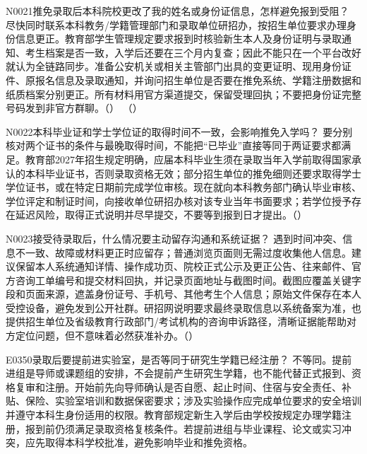 \begin{qa}{N0021}{推免录取后本科院校更改了我的姓名或身份证信息，怎样避免报到受阻？}
尽快同时联系本科教务/学籍管理部门和录取单位研招办，按招生单位要求办理身份信息更正。教育部学生管理规定要求报到时核验新生本人及身份证明与录取通知、考生档案是否一致，入学后还要在三个月内复查；因此不能只在一个平台改好就认为全链路同步。准备公安机关或相关主管部门出具的变更证明、现用身份证件、原报名信息及录取通知，并询问招生单位是否要在推免系统、学籍注册数据和纸质档案分别更正。所有材料用官方渠道提交，保留受理回执；不要把身份证完整号码发到非官方群聊。（） （）
\end{qa}
\begin{qa}{N0022}{本科毕业证和学士学位证的取得时间不一致，会影响推免入学吗？}
要分别核对两个证书的条件与最晚取得时间，不能把“已毕业”直接等同于两证要求都满足。教育部2027年招生规定明确，应届本科毕业生须在录取当年入学前取得国家承认的本科毕业证书，否则录取资格无效；部分招生单位的推免细则还要求取得学士学位证书，或在特定日期前完成学位审核。现在就向本科教务部门确认毕业审核、学位评定和制证时间，向接收单位研招办核对该专业当年书面要求；若学位授予存在延迟风险，取得正式说明并尽早提交，不要等到报到日才提出。（）
\end{qa}
\begin{qa}{N0023}{接受待录取后，什么情况要主动留存沟通和系统证据？}
遇到时间冲突、信息不一致、故障或材料更正时应留存；普通浏览页面则无需过度收集他人信息。建议保留本人系统通知详情、操作成功页、院校正式公示及更正公告、往来邮件、官方咨询工单编号和提交材料回执，并记录页面地址与截图时间。截图应覆盖关键字段和页面来源，遮盖身份证号、手机号、其他考生个人信息；原始文件保存在本人受控设备，避免发到公开社群。研招网说明要求最终录取信息以系统备案为准，也提供招生单位及省级教育行政部门/考试机构的咨询申诉路径，清晰证据能帮助对方定位问题，但不意味着必然获准补办。（）
\end{qa}



\begin{qa}{E0350}{录取后要提前进实验室，是否等同于研究生学籍已经注册？}
不等同。提前进组是导师或课题组的安排，不会提前产生研究生学籍，也不能代替正式报到、资格复审和注册。开始前先向导师确认是否自愿、起止时间、住宿与安全责任、补贴、保险、实验室培训和数据保密要求；涉及实验操作应完成单位要求的安全培训并遵守本科生身份适用的权限。教育部规定新生入学后由学校按规定办理学籍注册，报到前仍须满足录取资格复核条件。若提前进组与毕业课程、论文或实习冲突，应先取得本科学校批准，避免影响毕业和推免资格。
\end{qa}

